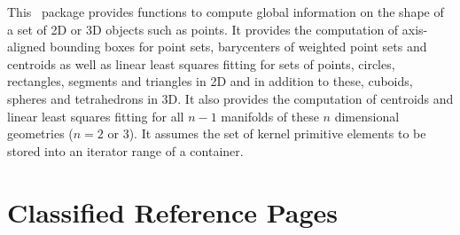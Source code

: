 




This \cgal\ package provides functions to compute global information
on the shape of a set of 2D or 3D objects such as points. It provides the computation of axis-aligned bounding boxes for point sets, barycenters of weighted point sets and centroids as well as linear least squares fitting for sets of points, circles, rectangles, segments and triangles in 2D and in addition to these, cuboids, spheres and tetrahedrons in 3D. It also provides the computation of centroids and linear least squares fitting for all $n-1$ manifolds of these $n$ dimensional geometries ($n = 2$ or $3$). It assumes the set of kernel primitive elements to be stored into an iterator range of a container.


\section{Classified Reference Pages}


\\
\\
\\
\\


\\
\\
\\
\\
\\

